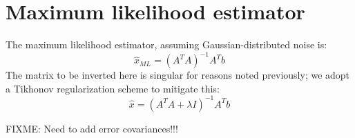 \documentclass[11pt,letterpaper]{article}
\begin{document}
\section{Maximum likelihood estimator}

The maximum likelihood estimator, assuming Gaussian-distributed noise is:
\begin{equation}
\hat{x}_{ML} = \left( A^T A  \right)^{-1} A^T b
\end{equation}
The matrix to be inverted here is singular for reasons noted previously; we adopt a Tikhonov regularization scheme to mitigate this:
\begin{equation}
\hat{x} = \left( A^T A  + \lambda I \right)^{-1} A^T b
\end{equation}

FIXME: Need to add error covariances!!!
\end{document}
